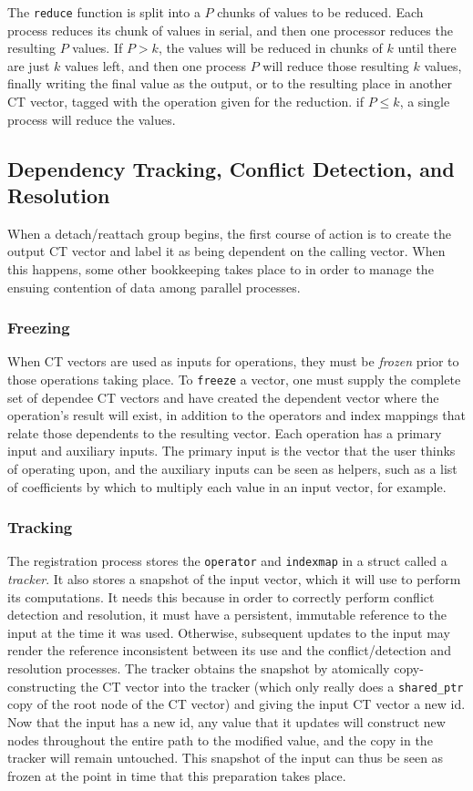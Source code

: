 \documentclass[pageno]{jpaper}
\begin{document}
The \texttt{reduce} function is split into a $P$ chunks of values to be reduced.
Each process reduces its chunk of values in serial, and then one processor
reduces the resulting $P$ values. If $P > k$, the values will be
reduced in chunks of $k$ until there are just $k$ values left, and then one
process $P$ will reduce those resulting $k$ values, finally writing the final
value as the output, or to the resulting place in another CT vector, tagged
with the operation given for the reduction. if $P \leq k$, a single process will
reduce the values.

\subsection{Dependency Tracking, Conflict Detection, and Resolution}
When a detach/reattach group begins, the first course of action is to create
the output CT vector and label it as being dependent on the calling vector.
When this happens, some other bookkeeping takes place to in order to manage the
ensuing contention of data among parallel processes.

\subsubsection{Freezing}
When CT vectors are used as inputs for operations, they must be \textit{frozen}
prior to those operations taking place. To \texttt{freeze} a vector, one must supply the
complete set of dependee CT vectors and have created the dependent vector where the
operation's result will exist, in addition to the operators and index mappings
that relate those dependents to the resulting vector. Each operation has a
primary input and auxiliary inputs. The primary input is the vector that the
user thinks of operating upon, and the auxiliary inputs can be seen as helpers,
such as a list of coefficients by which to multiply each value in an input
vector, for example.

\subsubsection{Tracking}
The registration process stores the \texttt{operator} and \texttt{indexmap} in a struct
called a \textit{tracker}. It also stores a snapshot of the input vector, which it
will use to perform its computations. It needs this because in order to
correctly perform conflict detection and resolution, it must have a persistent,
immutable reference to the input at the time it was used. Otherwise, subsequent
updates to the input may render the reference inconsistent between its use and
the conflict/detection and resolution processes. The tracker obtains the
snapshot by atomically copy-constructing the CT vector into the tracker (which
only really does a \texttt{shared\_ptr} copy of the root node of the CT vector)
and giving the input CT vector a new id. Now that the input has a new id, any
value that it updates will construct new nodes throughout the entire path to the
modified value, and the copy in the tracker will remain untouched. This snapshot
of the input can thus be seen as frozen at the point in time that this
preparation takes place.
\end{document}

